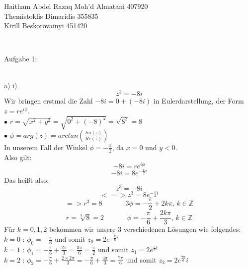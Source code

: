 \documentclass[11pt]{article}
\begin{document}
	\noindent \begin{huge}Haitham Abdel Razaq Moh'd Almatani  407920\\
	
	\noindent Themistoklis Dimaridis 355835\\
	
	
	\noindent Kirill Beskorovainyi 	451420\end{huge}\\\vspace{0.05in}
	
		\noindent \begin{Large}Aufgabe 1:\end{Large}\\[2pt]
			\indent a) \hspace{20pt} i)\\
				$$z^3 = -8i$$
				Wir bringen erstmal die Zahl $-8i=0+(-8i)$ in Eulerdarstellung, der Form $z=re^{i\phi}$.\\
				$\bullet$  $r=\sqrt{x^2+y^2}=\sqrt{0^2+(-8)^2}=\sqrt{8^2}=8$\\
				$\bullet$  $\phi = arg(z) = arctan\left(\frac{Im(z)}{Re(z)}\right)$\\
				\indent \indent In unserem Fall der Winkel $\phi = -\frac{\pi}{2}$, da $x=0$ und $y<0$.\\
				Also gilt:\\
				$$-8i=re^{i\phi}$$
				$$-8i=8e^{-\frac{\pi}{2}i}$$
				Das heißt also:\\
				$$z^3=-8i$$
				$$<=>z^3=8e^{-\frac{\pi}{2}i}$$
				$$=> r^3 = 8 \hspace{40pt} 3\phi = -\frac{\pi}{2}+2k\pi \mbox{, } k\in \mathbb{Z}$$
				$$r=\sqrt[3]{8}=2 \hspace{40pt} \phi = -\frac{\pi}{6}+\frac{2k\pi}{3} \mbox{, } k\in \mathbb{Z}$$
				Für $k=0,1,2$ bekommen wir unsere $3$ verschiedenen Lösungen wie folgendes:\\
				\indent $k=0$ \hspace{10pt}: \hspace{10pt} $\phi_0=-\frac{\pi}{6}$ und somit $z_0=2e^{-\frac{\pi}{6}i}$\\
				\indent $k=1$ \hspace{10pt}: \hspace{10pt} $\phi_1=-\frac{\pi}{6} + \frac{2\pi}{3}=\frac{3\pi}{6}=\frac{\pi}{2}$ und somit $z_1=2e^{\frac{\pi}{2}i}$\\
				\indent $k=2$ \hspace{10pt}: \hspace{10pt} $\phi_2=-\frac{\pi}{6}+\frac{2\times 2 \pi}{3}=-\frac{\pi}{6}+\frac{4\pi}{3}=\frac{7\pi}{6}$ und somit $z_2=2e^\frac{7\pi}{6}i$\\
\end{document}
